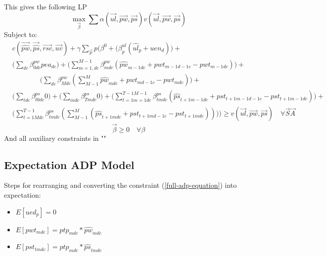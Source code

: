 \documentclass{article}
\begin{document}
This gives the following LP
\begin{equation}
	\max_{\vec{\beta}} \sum \alpha (\vec{ul}, \vec{pw}, \vec{ps}) v(\vec{ul}, \vec{pw}, \vec{ps})
\end{equation}
Subject to:
\begin{equation}\begin{alignedat}{10}
\label{full-adp-equation}
	& c(\vec{\hat{pw}}, \vec{\hat{ps}}, \vec{rsc}, \vec{uv}) + \gamma \sum_{\vec{p}} p \Bigg( 
		\beta^0 +
		\bigg( \beta^{ul}_{p} (\hat{ul}_{p} + uen_{d}) \bigg) + \\  
	& 	\bigg( \sum_{dc} \beta_{0dc}^{pw} pea_{dc} \bigg) +
		\bigg( \sum_{m=1,dc}^{M-1} \beta_{mdc}^{pw} 
			(\hat{pw}_{m-1dc} + pwt_{m-1d-1c} - pwt_{m-1dc}) \bigg) + \\
	&	\qquad \qquad \bigg( \sum_{dc} \beta_{Mdc}^{pw} 
			(\sum_{M-1}^{M} \hat{pw}_{mdc} + pwt_{md-1c} - pwt_{mdc})\bigg) + \\
	& 	\bigg( \sum_{tdc} \beta_{t0dc}^{ps} 0 \bigg) +
		\bigg( \sum_{mdc} \beta_{Tmdc}^{ps} 0 \bigg) +
		\bigg( \sum_{t=1m=1dc}^{T-1M-1} \beta_{tmdc}^{ps} 
			(\hat{ps}_{t+1m-1dc} + pst_{t+1m-1d-1c} - pst_{t+1m-1dc}) \bigg) + \\	
	&	\bigg( \sum_{t=1Mdc}^{T-1} \beta_{tmdc}^{ps} 
			(\sum_{M-1}^{M} (\hat{ps}_{t+1mdc} + pst_{t+1md-1c} - pst_{t+1mdc})) \bigg)
	\Bigg) \ge v(\vec{ul}, \vec{pw}, \vec{ps}) \quad \forall \vec{S} \vec{A}
\end{alignedat} \end{equation}
\begin{equation}
	\vec{\beta} \ge 0 \quad \forall \beta
\end{equation}
And all auxiliary constraints in ""



\subsection{Expectation ADP Model}
Steps for rearranging and converting the constraint (\ref{full-adp-equation}) into expectation:
\begin{itemize}
	\item $E[ued_p] = 0$
	\item $E[pwt_{mdc}] = ptp_{mdc} * \hat{pw}_{mdc}$ 
	\item $E[pst_{tmdc}] = ptp_{mdc} * \hat{ps}_{tmdc}$ 
\end{itemize}
\end{document}
